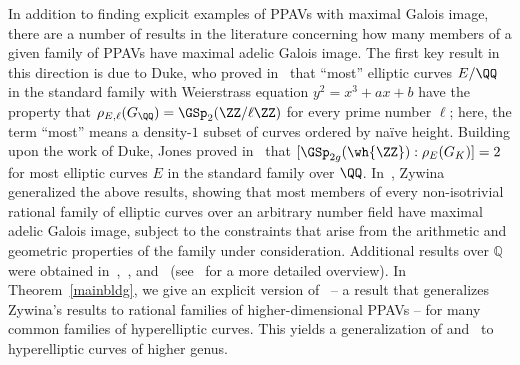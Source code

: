 In addition to finding explicit examples of PPAVs with maximal Galois image, there are a number of results in the literature concerning how many members of a given family of PPAVs have maximal adelic Galois image.
The first key result in this direction is due to Duke, who proved in~\cite{duke:elliptic-curves-with-no-exceptional-primes} that ``most'' elliptic curves $E/\QQ$ in the standard family with Weierstrass equation $y^2 = x^3 + ax + b$ have the property that $\rho_{E,\ell}(G_{\QQ}) = \GSp_2(\ZZ/\ell \ZZ)$ for every prime number $\ell$; here, the term ``most'' means a density-$1$ subset of curves ordered by na\"{i}ve height. Building upon the work of Duke, Jones proved in~\cite[Theorem 4]{josofabank} that $[\GSp_{2g}(\wh{\ZZ}) : \rho_E(G_K)] = 2$ for most elliptic curves $E$ in the standard family over $\QQ$.
In~\cite[Theorem 1.15]{zywina2010hilbert}, Zywina generalized 
the above results, showing that most members of every non-isotrivial rational family of elliptic curves over an arbitrary number field have maximal adelic Galois image, subject to the constraints that arise from the arithmetic and geometric properties of the family under consideration. 
Additional results over $\mathbb Q$ were
obtained in~\cite{grant:a-formula-for-the-number-of-elliptic-curves-with-exceptional-primes},~\cite{cojocaruH:uniform-results-for-serres-theorem-for-elliptic-curves}, and~\cite{cojocaruGJ:one-parameter-families-of-elliptic-curves}
(see~\cite[p.~6]{zywina2010hilbert} for a more detailed overview).
In Theorem~\ref{mainbldg}, we give an explicit version of~\cite[Theorem 1.1]{landesman-swaminathan-tao-xu:rational-families} -- a result that generalizes Zywina's results to rational families of higher-dimensional PPAVs --
for many common families of hyperelliptic curves.
This yields a generalization of \cite[Theorem 1.2]{zywina2010elliptic}
and~\cite[Theorem 4]{josofabank} %
to hyperelliptic curves of higher genus.


